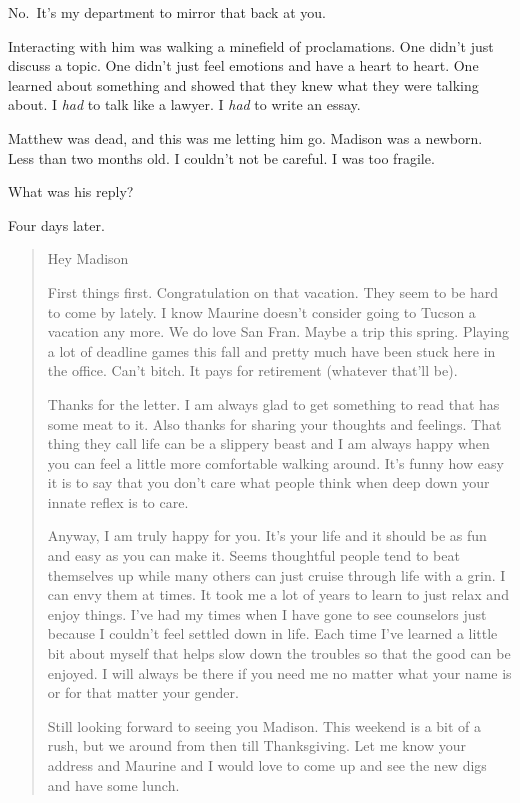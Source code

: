 \begin{paracol}{2}
\begin{leftcolumn}
\begin{ally}
No.~It's my department to mirror that back at you.
\end{ally}
Interacting with him was walking a minefield of proclamations. One didn't just discuss a topic. One didn't just feel emotions and have a heart to heart. One learned about something and showed that they knew what they were talking about. I \emph{had} to talk like a lawyer. I \emph{had} to write an essay.

Matthew was dead, and this was me letting him go. Madison was a newborn. Less than two months old. I couldn't not be careful. I was too fragile.

\begin{ally}
What was his reply?
\end{ally}
Four days later.

\begin{quotation}
Hey Madison

First things first. Congratulation on that vacation. They seem to be hard to come by lately. I know Maurine doesn’t consider going to Tucson a vacation any more. We do love San Fran. Maybe a trip this spring. Playing a lot of deadline games this fall and pretty much have been stuck here in the office. Can’t bitch. It pays for retirement (whatever that’ll be).

Thanks for the letter. I am always glad to get something to read that has some meat to it. Also thanks for sharing your thoughts and feelings. That thing they call life can be a slippery beast and I am always happy when you can feel a little more comfortable walking around. It’s funny how easy it is to say that you don’t care what people think when deep down your innate reflex is to care.

Anyway, I am truly happy for you. It’s your life and it should be as fun and easy as you can make it. Seems thoughtful people tend to beat themselves up while many others can just cruise through life with a grin. I can envy them at times.  It took me a lot of years to learn to just relax and enjoy things. I’ve had my times when I have gone to see counselors just because I couldn’t feel settled down in life. Each time I’ve learned a little bit about myself that helps slow down the troubles so that the good can be enjoyed. I will always be there if you need me no  matter what your name is or for that matter your gender.

Still looking forward to seeing you Madison. This weekend is a bit of a rush, but we around from then till Thanksgiving. Let me know your address and Maurine and I would love to come up and see the new digs and have some lunch.


\end{quotation}
\end{leftcolumn}
\end{paracol}
